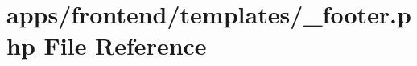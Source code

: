 \hypertarget{frontend_2templates_2__footer_8php}{\section{apps/frontend/templates/\-\_\-footer.php File Reference}
\label{frontend_2templates_2__footer_8php}
}
